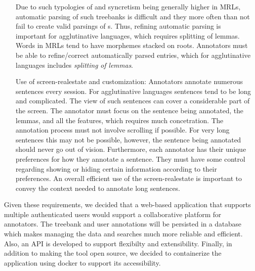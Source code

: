 \begin{itemize}[before=\normalfont, font=\itshape, align=left]
        Due to such typologies of and syncretism being generally higher in MRLs, automatic parsing of such treebanks is difficult and they more often than not fail to create valid parsings of \form s.
        Thus, refining automatic parsing is important for agglutinative languages, which requires splitting of lemmas.
       Words in MRLs tend to have morphemes stacked on roots.
		Annotators must be able to refine/correct automatically parsed entries, which for agglutinative languages includes \textit{splitting of lemmas}.
    \item[Use of screen-realestate and customization:]
	Annotators annotate numerous sentences every session. 
	For agglutinative languages sentences tend to be long and complicated. 
	The view of such sentences can cover a considerable part of the screen. 
	The annotator must focus on the sentence being annotated, the lemmas, and all the features, which requires much concetration. 
	The annotation process must not involve scrolling if possible. 
	For very long sentences this may not be possible, however, the sentence being annotated should never go out of vision.  
	Furthermore, each annotator has their unique preferences for how they annotate a sentence. 
	They must have some control regarding showing or hiding certain information according to their preferences. 
        An overall efficient use of the screen-realestate is important to convey the context needed to annotate long sentences. 
\end{itemize}


Given these requirements, we decided that a web-based application that supports multiple authenticated users would support a collaborative platform for annotators. 
The treebank and user annotations will be persisted in a database which makes managing the data and searches much more reliable and efficient.
Also, an API is developed to support flexibilty and extensibility. 
Finally, in addition to making the tool open source, we decided to containerize the application using docker to support its accessibility. 

